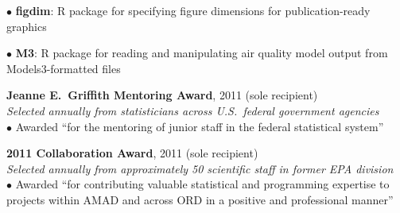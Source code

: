\documentclass[11pt]{article}
\def\newsectn{\vspace*{0.6cm}}
\def\newitem{\vspace*{0.2cm}}
\begin{document}
$\bullet$ \textbf{figdim}: R package for specifying figure dimensions for publication-ready graphics

$\bullet$ \textbf{M3}: R package for reading and manipulating air quality model output from Models3-formatted files




\newsectn
{}

\textbf{Jeanne E.~Griffith Mentoring Award}, 2011 (sole recipient)\\  %
\textit{Selected annually from statisticians across U.S.~federal government agencies}\\
$\bullet$ Awarded ``for the mentoring of junior staff in the federal statistical
system''

\newitem
\textbf{2011 Collaboration Award}, 2011 (sole recipient)\\
\textit{Selected annually from approximately 50 scientific staff in former EPA division}\\
$\bullet$ Awarded ``for contributing valuable statistical and programming
expertise to projects within AMAD and across ORD in a positive and professional
manner''\\

\end{document}
